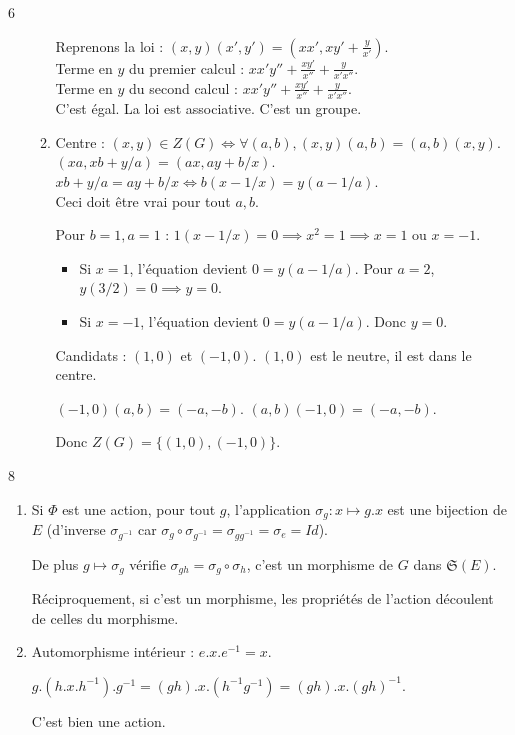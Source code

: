 \begin{correction}{6}
\begin{enumerate}
\begin{enumerate}
        Reprenons la loi : $(x,y)(x',y')=(xx', xy'+\frac{y}{x'})$. \\
        Terme en $y$ du premier calcul : $xx'y'' + \frac{xy'}{x''} + \frac{y}{x'x''}$. \\
        Terme en $y$ du second calcul : $xx'y'' + \frac{xy'}{x''} + \frac{y}{x'x''}$. \\
        C'est égal. La loi est associative. C'est un groupe.
    \item 
        Centre : $(x,y) \in Z(G) \iff \forall (a,b), (x,y)(a,b) = (a,b)(x,y)$. \\
        $(xa, xb + y/a) = (ax, ay + b/x)$. \\
        $xb + y/a = ay + b/x \iff b(x - 1/x) = y(a - 1/a)$. \\
        Ceci doit être vrai pour tout $a,b$.

        Pour $b=1, a=1$ : $1(x-1/x) = 0 \implies x^2=1 \implies x=1$ ou $x=-1$.
        \begin{itemize}
            \item Si $x=1$, l'équation devient $0 = y(a-1/a)$. Pour $a=2$, $y(3/2)=0 \implies y=0$.
            \item Si $x=-1$, l'équation devient $0 = y(a-1/a)$. Donc $y=0$.
        \end{itemize}
        Candidats : $(1,0)$ et $(-1,0)$.
        $(1,0)$ est le neutre, il est dans le centre.

        $(-1,0)(a,b) = (-a, -b)$. $(a,b)(-1,0) = (-a, -b)$.

        Donc $Z(G) = \{ (1,0), (-1,0) \}$.
    \end{enumerate}
\end{enumerate}
\end{correction}

\begin{correction}{8}
\begin{enumerate}
    \item Si $\Phi$ est une action, pour tout $g$, l'application $\sigma_g : x \mapsto g.x$ 
        est une bijection de $E$ (d'inverse $\sigma_{g^{-1}}$ car $\sigma_g \circ \sigma_{g^{-1}} = \sigma_{gg^{-1}} = \sigma_e = Id$).

        De plus $g \mapsto \sigma_g$ vérifie $\sigma_{gh} = \sigma_g \circ \sigma_h$, c'est un morphisme de $G$ dans $\mathfrak{S}(E)$.
        
        Réciproquement, si c'est un morphisme, les propriétés de l'action découlent de celles du morphisme.

    \item Automorphisme intérieur :
        $e.x.e^{-1} = x$.

        $g.(h.x.h^{-1}).g^{-1} = (gh).x.(h^{-1}g^{-1}) = (gh).x.(gh)^{-1}$.

        C'est bien une action.
\end{enumerate}
\end{correction}

